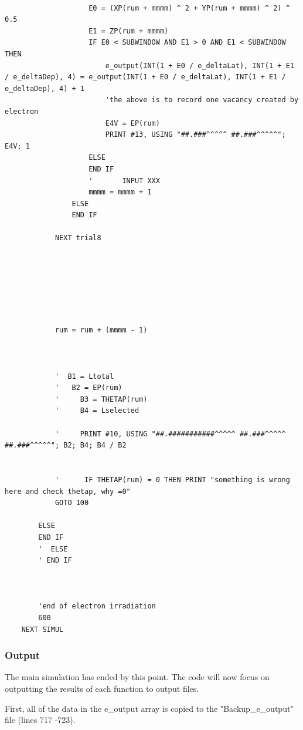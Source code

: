 \documentclass[10pt, reqno]{exam}
\begin{document}
\begin{verbatim}

                    E0 = (XP(rum + mmmm) ^ 2 + YP(rum + mmmm) ^ 2) ^ 0.5
                    E1 = ZP(rum + mmmm)
                    IF E0 < SUBWINDOW AND E1 > 0 AND E1 < SUBWINDOW THEN
                        e_output(INT(1 + E0 / e_deltaLat), INT(1 + E1 / e_deltaDep), 4) = e_output(INT(1 + E0 / e_deltaLat), INT(1 + E1 / e_deltaDep), 4) + 1
                        'the above is to record one vacancy created by electron
                        E4V = EP(rum)
                        PRINT #13, USING "##.###^^^^^ ##.###^^^^^"; E4V; 1
                    ELSE
                    END IF
                    '       INPUT XXX
                    mmmm = mmmm + 1
                ELSE
                END IF
    
            NEXT trial8
    
    
    
    
    
    
    
            rum = rum + (mmmm - 1)
    
    
    
            '  B1 = Ltotal
            '   B2 = EP(rum)
            '     B3 = THETAP(rum)
            '     B4 = Lselected
    
            '     PRINT #10, USING "##.###########^^^^^ ##.###^^^^^ ##.###^^^^^"; B2; B4; B4 / B2
    
    
            '      IF THETAP(rum) = 0 THEN PRINT "something is wrong here and check thetap, why =0"
            GOTO 100
    
        ELSE
        END IF
        '  ELSE
        ' END IF
    
    
    
        'end of electron irradiation
        600
    NEXT SIMUL
\end{verbatim}

\subsubsection{Output}

The main simulation has ended by this point. The code will now focus on outputting the results of each function to output files. \par

First, all of the data in the e\_output array is copied to the "Backup\_e\_output" file (lines 717 -723). \par
\end{document}
